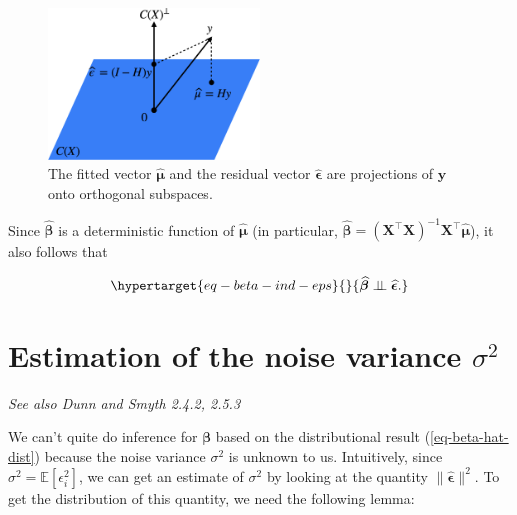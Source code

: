 \documentclass[
  11pt,
  letterpaper,
  oneside]{book}
\theoremstyle{definition}
\theoremstyle{plain}
\theoremstyle{plain}
\theoremstyle{plain}
\theoremstyle{remark}
\begin{document}
\begin{figure}

{\centering \includegraphics[width=0.5\textwidth,height=\textheight]{figures/orthogonality-fit-residuals.jpg}

}

\caption{\label{fig-orthogonality-fit-residuals}The fitted vector
\(\boldsymbol{\widehat{\mu}}\) and the residual vector
\(\boldsymbol{\widehat{\epsilon}}\) are projections of
\(\boldsymbol{y}\) onto orthogonal subspaces.}

\end{figure}

Since \(\boldsymbol{\widehat{\beta}}\) is a deterministic function of
\(\boldsymbol{\widehat{\mu}}\) (in particular,
\(\boldsymbol{\widehat{\beta}} = (\boldsymbol{X}^\top \boldsymbol{X})^{-1}\boldsymbol{X}^\top \boldsymbol{\widehat{\mu}}\)),
it also follows that

\begin{equation}\protect\hypertarget{eq-beta-ind-eps}{}{
\boldsymbol{\widehat{\beta}} \perp\!\!\!\perp \boldsymbol{\widehat{\epsilon}}.
}\label{eq-beta-ind-eps}\end{equation}

\hypertarget{sec-noise-estimation}{%
\section{\texorpdfstring{Estimation of the noise variance
\(\sigma^2\)}{Estimation of the noise variance \textbackslash sigma\^{}2}}\label{sec-noise-estimation}}

\emph{See also Dunn and Smyth 2.4.2, 2.5.3}

We can't quite do inference for \(\boldsymbol{\beta}\) based on the
distributional result (\ref{eq-beta-hat-dist}) because the noise
variance \(\sigma^2\) is unknown to us. Intuitively, since
\(\sigma^2 = \mathbb{E}[\epsilon_i^2]\), we can get an estimate of
\(\sigma^2\) by looking at the quantity
\(\|\boldsymbol{\widehat{\epsilon}}\|^2\). To get the distribution of
this quantity, we need the following lemma:
\end{document}
